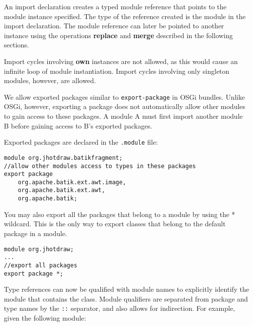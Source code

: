 An import declaration creates a typed module reference that points to the module
instance specified. The type of the reference created is the module
in the import declaration. The module reference can later be pointed to another
instance using the operations \textbf{replace} and \textbf{merge} described
in the following sections.

Import cycles involving \textbf{own} instances are not allowed, as this would 
cause an infinite loop of module instantiation. Import cycles involving only
singleton modules, however, are allowed.


We allow exported packages similar to {\tt export-package} in OSGi bundles. Unlike OSGi, however,
exporting a package does not automatically allow other modules to gain
access to these packages. A module A must first import another module B
before gaining access to B's exported packages.

Exported packages are declared in the {\tt .module} file:

\begin{lstlisting}
module org.jhotdraw.batikfragment;
//allow other modules access to types in these packages
export package 
	org.apache.batik.ext.awt.image,
	org.apache.batik.ext.awt,
	org.apache.batik;
\end{lstlisting}

You may also export all the packages that belong to a module by using
the * wildcard. This is the only way to export classes that belong to
the default package in a module.

\begin{lstlisting}
module org.jhotdraw;
...
//export all packages
export package *;
\end{lstlisting}




Type references can now be qualified with module names to explicitly
identify the module that contains the class. Module qualifiers
are separated from package and type names by the \texttt{::} separator,
and also allows for indirection. For example, given the following module:


